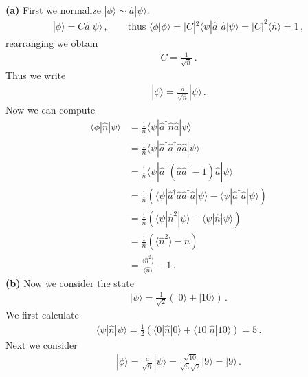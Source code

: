 \documentclass[11pt, oneside]{book}
\theoremstyle{break}
\theoremstyle{break}
\begin{document}
\chapter{}
\textbf{(a)} First we normalize $|\phi\rangle \sim \hat{a}|\psi\rangle$. 
\begin{align*}
|\phi\rangle = C \hat{a}|\psi\rangle\,,\qquad
\text{thus }\langle \phi | \phi\rangle = |C|^2 \langle \psi | \hat{a}^\dagger \hat{a} |\psi\rangle = |C|^2 \langle \hat{n}\rangle= 1\,,
\end{align*}
rearranging we obtain
\begin{align*}
C = \frac{1}{\sqrt{\bar{n}}}\,.
\end{align*}
Thus we write
\begin{align*}
|\phi\rangle = \frac{\hat{a}}{\sqrt{\bar{n}}}|\psi\rangle\,.
\end{align*}
Now we can compute
\begin{align*}
\langle \phi | \hat{n}|\psi\rangle &= \frac{1}{\bar{n}} \langle \psi | \hat{a}^\dagger \hat{n} \hat{a} | \psi\rangle\\ 
&= \frac{1}{\bar{n}}\langle \psi | \hat{a}^\dagger\hat{a}^\dagger \hat{a}\hat{a}|\psi\rangle \\
&= \frac{1}{\bar{n}}\langle \psi | \hat{a}^\dagger(\hat{a}\hat{a}^\dagger-1 ) \hat{a}|\psi\rangle \\
&= \frac{1}{\bar{n}}\left(
\langle \psi | \hat{a}^\dagger \hat{a}\hat{a}^\dagger\hat{a}|\psi\rangle
-
\langle \psi | \hat{a}^\dagger \hat{a}|\psi\rangle
\right) \\
&= \frac{1}{\bar{n}}\left(
\langle \psi |\hat{n}^2 |\psi\rangle -
\langle \psi | \hat{n}|\psi\rangle
\right) \\
&= \frac{1}{\bar{n}}\left(
\langle \hat{n}^2\rangle -
\bar{n}
\right) \\
&= \frac{\langle \hat{n}^2\rangle}{\langle \hat{n}\rangle} - 1\,.
\end{align*}
\textbf{(b)} Now we consider the state
\begin{align*}
|\psi\rangle = \frac{1}{\sqrt{2}}\left( |0\rangle + |10\rangle\right)\,.
\end{align*}
We first calculate
\begin{align*}
\langle \psi |\hat{n}|\psi\rangle = \frac{1}{2}\left( \langle 0 | \hat{n}|0\rangle +
\langle 10 | \hat{n}|10\rangle\right) = 5\,.
\end{align*}
Next we consider
\begin{align*}
|\phi\rangle = \frac{\hat{a}}{\sqrt{\bar{n}}} |\psi\rangle = \frac{\sqrt{10}}{\sqrt{5}\sqrt{2}}|9\rangle = |9\rangle\,.
\end{align*}
\end{document}
